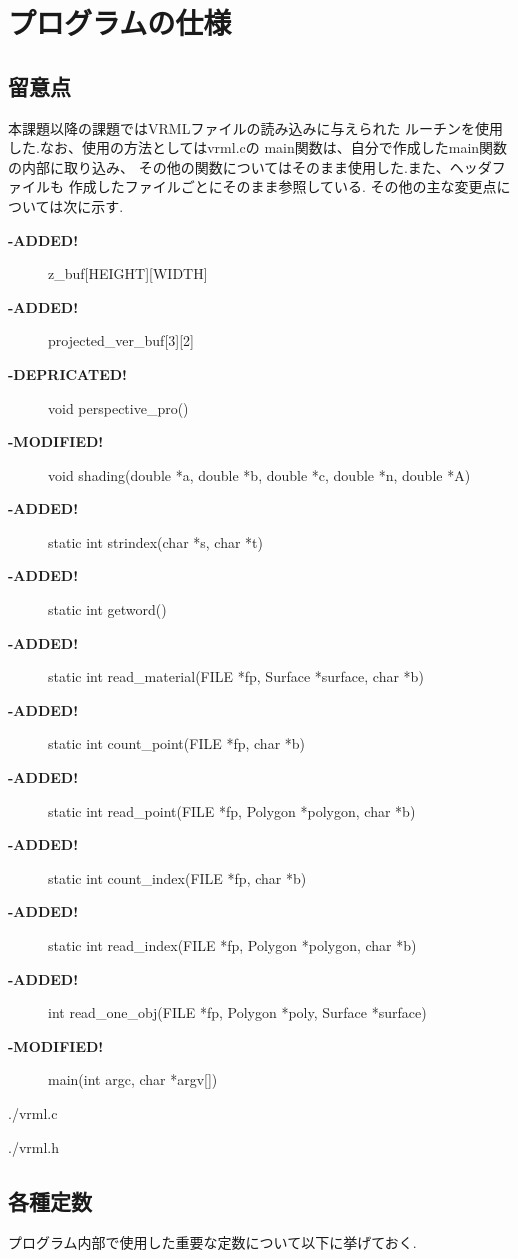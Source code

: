 \documentclass[a4j,dvipdfmx]{jsarticle}
\begin{document}
\section{プログラムの仕様}
\subsection{留意点}
本課題以降の課題ではVRMLファイルの読み込みに与えられた
ルーチンを使用した.なお、使用の方法としてはvrml.cの
main関数は、自分で作成したmain関数の内部に取り込み、
その他の関数についてはそのまま使用した.また、ヘッダファイルも
作成したファイルごとにそのまま参照している.
その他の主な変更点については次に示す.
\begin{description}
\item[{\bf -ADDED!}]z\_buf[HEIGHT][WIDTH]
\item[{\bf -ADDED!}]projected\_ver\_buf[3][2]
\item[{\bf -DEPRICATED!}]void perspective\_pro()
\item[{\bf -MODIFIED!}]void shading(double *a, double *b, double *c, double *n, double *A)
\item[{\bf -ADDED!}]static int strindex(char *s, char *t)
\item[{\bf -ADDED!}]static int getword()
\item[{\bf -ADDED!}]static int read\_material(FILE *fp, Surface *surface, char *b)
\item[{\bf -ADDED!}]static int count\_point(FILE *fp, char *b)
\item[{\bf -ADDED!}]static int read\_point(FILE *fp, Polygon *polygon, char *b)
\item[{\bf -ADDED!}]static int count\_index(FILE *fp, char *b)
\item[{\bf -ADDED!}]static int read\_index(FILE *fp, Polygon *polygon, char *b)
\item[{\bf -ADDED!}]int read\_one\_obj(FILE *fp, Polygon *poly, Surface *surface)
\item[{\bf -MODIFIED!}]main(int argc, char *argv[])
\end{description}


                {./vrml.c}
                

                {./vrml.h}

\subsection{各種定数}
プログラム内部で使用した重要な定数について以下に挙げておく.
\end{document}
